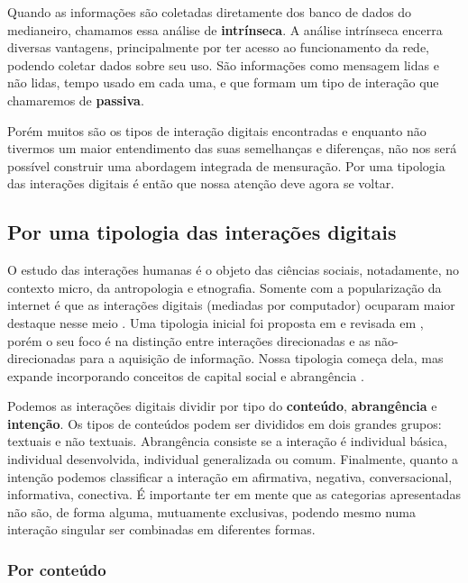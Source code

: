 \documentclass{article}
\begin{document}
Quando as informações são coletadas diretamente dos banco de dados do
medianeiro, chamamos essa análise de \textbf{intrínseca}. A análise intrínseca
encerra diversas vantagens, principalmente por ter acesso ao funcionamento da
rede, podendo coletar dados sobre seu uso. São informações como mensagem lidas e
não lidas, tempo usado em cada uma, e que formam um tipo de interação que
chamaremos de \textbf{passiva}.

Porém muitos são os tipos de interação digitais encontradas e enquanto não
tivermos um maior entendimento das suas semelhanças e diferenças, não nos será
possível construir uma abordagem integrada de mensuração. Por uma tipologia das
interações digitais é então que nossa atenção deve agora se voltar.

\subsection{Por uma tipologia das interações digitais}

O estudo das interações humanas é o objeto das ciências sociais, notadamente, no
contexto micro, da antropologia e etnografia. Somente com a popularização da
internet é que as interações digitais (mediadas por computador) ocuparam maior
destaque nesse meio \cite{Wellman1996}\cite{Herring2002}. Uma tipologia inicial
foi proposta em \cite{Burnett2000} e revisada em \cite{Burnett2004}, porém o
seu foco é na distinção entre interações direcionadas e as não-direcionadas para
a aquisição de informação. Nossa tipologia começa dela, mas expande incorporando
conceitos de capital social \cite{Recuero2008} e abrangência
\cite{MARTINEZ2000}.

Podemos as interações digitais dividir por tipo do \textbf{conteúdo},
\textbf{abrangência} e \textbf{intenção}. Os tipos de conteúdos podem ser
divididos em dois grandes grupos: textuais e não textuais. Abrangência consiste
se a interação é individual básica, individual desenvolvida, individual
generalizada ou comum. Finalmente, quanto a intenção podemos classificar a
interação em afirmativa, negativa, conversacional, informativa, conectiva. É
importante ter em mente que as categorias apresentadas não são, de forma alguma,
mutuamente exclusivas, podendo mesmo numa interação singular ser combinadas em
diferentes formas.

\subsubsection{Por conteúdo}
\end{document}
